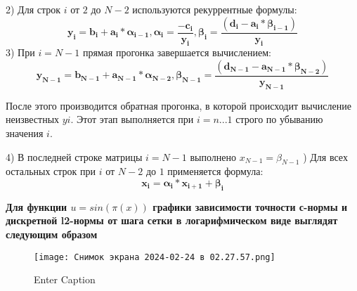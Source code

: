 \documentclass{beamer}
\begin{document}
\begin{frame}
2) Для строк $i$ от $2$ до $N-2$ используются рекуррентные формулы:
\[\mathbf{y_i=b_i+a_i*\alpha_{i-1}, \alpha_i=\frac{-c_i}{y_i}, \beta_i=\frac{(d_i-a_i*\beta_{i-1})}{y_i}}\]
3) При $i = N - 1$ прямая прогонка завершается вычислением: 
\[\mathbf{y_{N-1}=b_{N-1}+a_{N-1}*\alpha_{N-2}, \beta_{N-1}=\frac{(d_{N-1}-a_{N-1}*\beta_{N-2})}{y_{N-1}}}\]

После этого производится обратная прогонка, в которой происходит вычисление неизвестных $yi$. Этот этап выполняется при $i = n...1$ строго по
убыванию значения $i$.

4) В последней строке матрицы $i = N - 1$ выполнено $x_{N-1} = \beta_{N-1}$
) Для всех остальных строк при $i$ от $N-2$ до $1$ применяется формула:
\[\mathbf{x_i=\alpha_i*x_{i+1}+\beta_{i}}\]
\end{frame}

\begin{frame}
\textbf{Для функции $u=sin(\pi(x))$ графики зависимости точности с-нормы и дискретной l2-нормы от шага сетки в логарифмическом виде выглядят следующим образом}

\begin{figure}
    \centering
    \texttt{[image: Снимок экрана 2024-02-24 в 02.27.57.png]}
    \caption{Enter Caption}
    \label{fig:enter-label}
\end{figure}
\end{frame}
\end{document}
